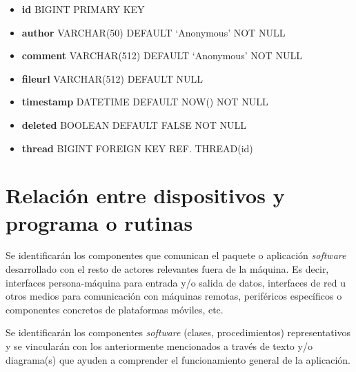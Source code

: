 \documentclass[12pt,a4paper,titlepage]{article}
\begin{document}
    \begin{itemize}
        \item \textbf{id} BIGINT PRIMARY KEY
        \item \textbf{author} VARCHAR(50) DEFAULT `Anonymous' NOT NULL
        \item \textbf{comment} VARCHAR(512) DEFAULT `Anonymous' NOT NULL
        \item \textbf{fileurl} VARCHAR(512) DEFAULT NULL
        \item \textbf{timestamp} DATETIME DEFAULT NOW() NOT NULL
        \item \textbf{deleted} BOOLEAN DEFAULT FALSE NOT NULL
        \item \textbf{thread} BIGINT FOREIGN KEY REF. THREAD(id)
    \end{itemize}

    




    \section{Relación entre dispositivos y programa o rutinas}

    Se identificarán los componentes que comunican el paquete o aplicación \textit{software} desarrollado con el resto de actores relevantes fuera de la máquina. Es decir, interfaces persona-máquina para entrada y/o salida de datos, interfaces de red u otros medios para comunicación con máquinas remotas, periféricos específicos o componentes concretos de plataformas móviles, etc.

    Se identificarán los componentes \textit{software} (clases, procedimientos) representativos y se vincularán con los anteriormente mencionados a través de texto y/o diagrama(s) que ayuden a comprender el funcionamiento general de la aplicación.
\end{document}
